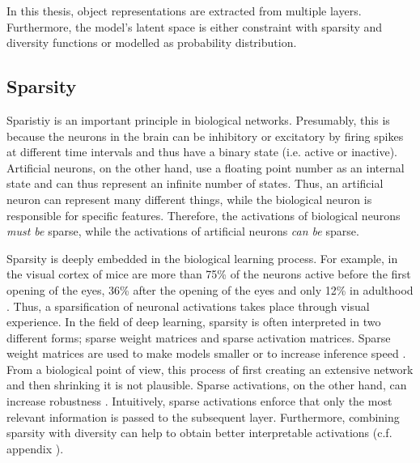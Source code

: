 In this thesis, object representations are extracted from multiple layers. Furthermore, the model's latent space is either constraint with sparsity and diversity functions or modelled as probability distribution.

\subsection{Sparsity}
Sparistiy is an important principle in biological networks.
Presumably, this is because the neurons in the brain can be inhibitory or excitatory by firing spikes at different time intervals and thus have a binary state (i.e. active or inactive). Artificial neurons, on the other hand, use a floating point number as an internal state and can thus represent an infinite number of states.
Thus, an artificial neuron can represent many different things, while the biological neuron is responsible for specific features.
Therefore, the activations of biological neurons \emph{must be} sparse, while the activations of artificial neurons \emph{can be} sparse.

Sparsity is deeply embedded in the biological learning process.
For example, in the visual cortex of mice are more than 75\% of the neurons active before the first opening of the eyes, 36\% after the opening of the eyes and only 12\% in adulthood .
Thus, a sparsification of neuronal activations takes place through visual experience.
In the field of deep learning, sparsity is often interpreted in two different forms; sparse weight matrices and sparse activation matrices.
Sparse weight matrices are used to make models smaller or to increase inference speed .
From a biological point of view, this process of first creating an extensive network and then shrinking it is not plausible.
Sparse activations, on the other hand, can increase robustness \cite{Panousis_Chatzis_Theodoridis_2021}.
Intuitively, sparse activations enforce that only the most relevant information is passed to the subsequent layer.
Furthermore, combining sparsity with diversity can help to obtain better interpretable activations (c.f. appendix ).

